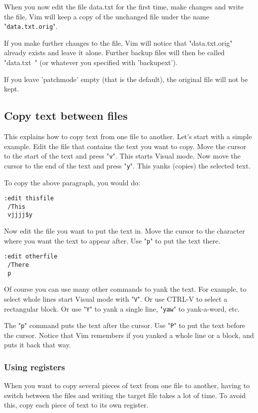 When you now edit the file data.txt for the first time, make changes and write the file, Vim will keep a copy of the unchanged file under the name "\verb!data.txt.orig!".

If you make further changes to the file, Vim will notice that "data.txt.orig" already exists and leave it alone.
Further backup files will then be called "data.txt~" (or whatever you specified with 'backupext').

If you leave 'patchmode' empty (that is the default), the original file will not be kept.

\subsection{Copy text between files}
This explains how to copy text from one file to another.
Let's start with a simple example.
Edit the file that contains the text you want to copy.
Move the cursor to the start of the text and press "\verb!v!".
This starts Visual mode.
Now move the cursor to the end of the text and press "\verb!y!".
This yanks (copies) the selected text.

To copy the above paragraph, you would do:

 \begin{Verbatim}[samepage=true]
 :edit thisfile
 /This
 vjjjj$y
 \end{Verbatim}

Now edit the file you want to put the text in.
Move the cursor to the character where you want the text to appear after.
Use "\verb!p!" to put the text there.

 \begin{Verbatim}[samepage=true]
 :edit otherfile
 /There
 p
 \end{Verbatim}

Of course you can use many other commands to yank the text.
For example, to select whole lines start Visual mode with "\verb!V!".
Or use CTRL-V to select a rectangular block.
Or use "\verb!Y!" to yank a single line, "\verb!yaw!" to yank-a-word, etc.

The "\verb!p!" command puts the text after the cursor.
Use "\verb!P!" to put the text before the cursor.
Notice that Vim remembers if you yanked a whole line or a block, and puts it back that way.

\subsubsection{Using registers}
When you want to copy several pieces of text from one file to another, having to switch between the files and writing the target file takes a lot of time.
To avoid this, copy each piece of text to its own register.

